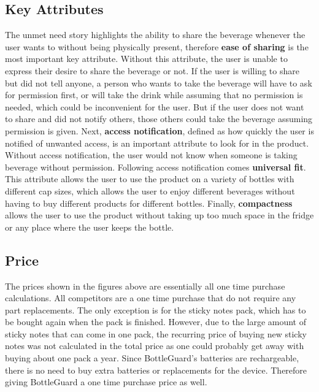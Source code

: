 \documentclass[12pt]{article}
\begin{document}
	\subsection*{Key Attributes}
	The unmet need story highlights the ability to share the beverage whenever the user wants to without being physically present, therefore \textbf{ease of sharing} is the most important key attribute. Without this attribute, the user is unable to express their desire to share the beverage or not. If the user is willing to share but did not tell anyone, a person who wants to take the beverage will have to ask for permission first, or will take the drink while assuming that no permission is needed, which could be inconvenient for the user. But if the user does not want to share and did not notify others, those others could take the beverage assuming permission is given. Next, \textbf{access notification}, defined as how quickly the user  is notified of unwanted access, is an important attribute to look for in the product. Without access notification, the user would not know when someone is taking beverage without permission. Following access notification comes \textbf{universal fit}. This attribute allows the user to use the product on a variety of bottles with different cap sizes, which allows the user to enjoy different beverages without having to buy different products for different bottles. Finally, \textbf{compactness} allows the user to use the product without taking up too much space in the fridge or any place where the user keeps the bottle.
	
	\subsection*{Price}
	The prices shown in the figures above are essentially all one time purchase calculations.  All competitors are a one time purchase that do not require any part replacements. The only exception is for the sticky notes pack, which has to be bought again when the pack is finished. However, due to the large amount of sticky notes that can come in one pack, the recurring price of buying new sticky notes was not calculated in the total price as one could probably get away with buying about one pack a year. Since BottleGuard’s batteries are rechargeable, there is no need to buy extra batteries or replacements for the device. Therefore giving BottleGuard a one time purchase price as well.  
	
\end{document}
